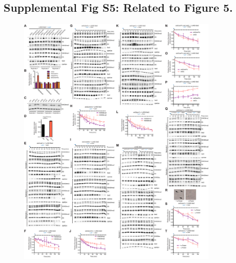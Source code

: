 \documentclass[11pt]{biorxiv}
\begin{document}
\subsection{Supplemental Fig S5: Related to Figure 5.}
\begin{figure}[ht!]
\center
\includegraphics[width=0.85\textwidth, trim={0in 0in 0in 0in}, clip]{figures/Supplemental_Fig_S5_compressed.pdf}
\end{figure}
\end{document}

